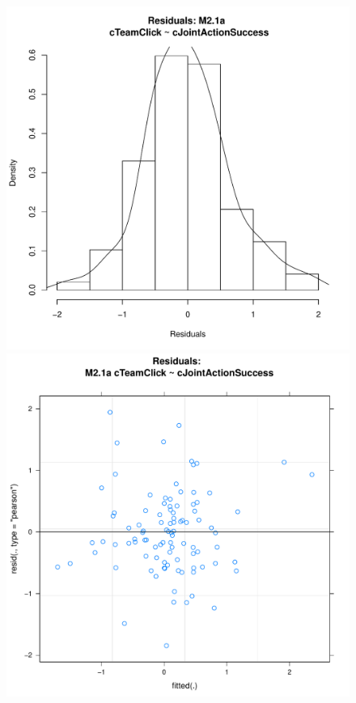 \documentclass[12pt]{report}
\begin{document}
{

\begin{figure}[htbp]
  \includegraphics[scale =.4]{../images/MLM21aHist.pdf}
  \includegraphics[scale =.4]{../images/MLM21aScatter.pdf}

\end{figure}}
\end{document}
